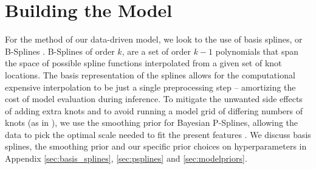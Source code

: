 \section{Building the Model} \label{sec:methods}

For the method of our data-driven model, we look to the use of basis splines, or B-Splines \citep{deBoor78}. B-Splines of order $k$, are a set of order $k-1$ polynomials that 
span the space of possible spline functions interpolated from a given set of knot locations. The basis representation of the splines allows for the computational 
expensive interpolation to be just a single preprocessing step -- amortizing the cost of model evaluation during inference. To mitigate the unwanted side effects of 
adding extra knots and to avoid running a model grid of differing numbers of knots (as in \citet{Edelman_2022ApJ}), we use the smoothing prior for Bayesian P-Splines, 
allowing the data to pick the optimal scale needed to fit the present features \citep{eilers2021practical,BayesianPSplines,Jullion2007RobustSO}. We discuss basis splines, the smoothing prior 
and our specific prior choices on hyperparameters in Appendix \ref{sec:basis_splines}, \ref{sec:psplines} and \ref{sec:modelpriors}. 

